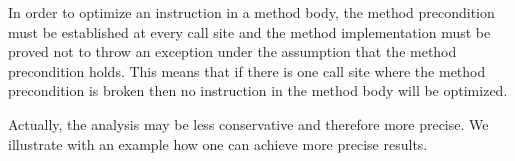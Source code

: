 


In order to optimize an instruction in a method body, the method precondition must be established at every call site and the method implementation must be proved not to throw an exception under the assumption that the method precondition holds. This means that if there is one call site where the method precondition is broken then no instruction in the method body will be optimized.

Actually, the analysis may be less conservative and therefore more precise. We illustrate with an example how
one can achieve more precise results.

